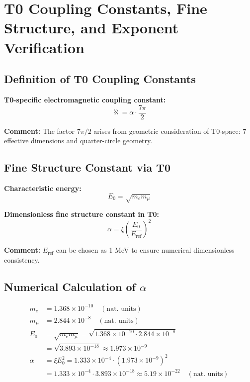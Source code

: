 \documentclass[12pt,a4paper]{article}
\newcommand{\xipar}{\xi}            %
\newcommand{\alphagem}{\alpha}      %
\newcommand{\Ezero}{E_0}            %
\begin{document}
\section{T0 Coupling Constants, Fine Structure, and Exponent Verification}

\subsection{Definition of T0 Coupling Constants}

\textbf{T0-specific electromagnetic coupling constant:}
\begin{equation}
	\aleph = \alphagem \cdot \frac{7\pi}{2}
\end{equation}

\textbf{Comment:} The factor $7\pi/2$ arises from geometric consideration of T0-space: 7 effective dimensions and quarter-circle geometry.

\subsection{Fine Structure Constant via T0}

\textbf{Characteristic energy:}
\begin{equation}
	\Ezero = \sqrt{m_e m_\mu}
\end{equation}

\textbf{Dimensionless fine structure constant in T0:}
\begin{equation}
	\alphagem = \xipar \left(\frac{\Ezero}{E_\text{ref}}\right)^2
\end{equation}

\textbf{Comment:} $E_\text{ref}$ can be chosen as 1 MeV to ensure numerical dimensionless consistency.

\subsection{Numerical Calculation of $\alphagem$}

\begin{align}
	m_e &= 1.368 \times 10^{-10} \quad (\text{nat. units}) \\
	m_\mu &= 2.844 \times 10^{-8} \quad (\text{nat. units}) \\
	\Ezero &= \sqrt{m_e m_\mu} = \sqrt{1.368 \times 10^{-10} \cdot 2.844 \times 10^{-8}} \\
	&= \sqrt{3.893 \times 10^{-18}} \approx 1.973 \times 10^{-9} \\
	\alphagem &= \xipar \Ezero^2 = 1.333 \times 10^{-4} \cdot (1.973 \times 10^{-9})^2 \\
	&= 1.333 \times 10^{-4} \cdot 3.893 \times 10^{-18} \approx 5.19 \times 10^{-22} \quad (\text{nat. units})
\end{align}
\end{document}
